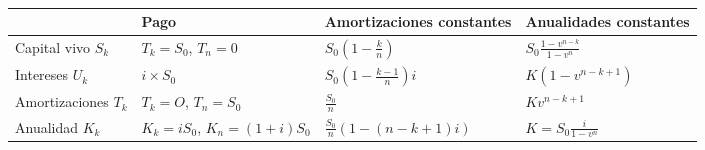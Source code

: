 \begin{f} 
\ \newline

	\footnotesize
\renewcommand{\arraystretch}{2}
\begin{tabular}{|m{10ex}|m{19ex}|m{19ex}|m{17ex}|}
\rowcolor{BleuProfondIRA!40}   	\hline &\textbf{Pago}			&   	\textbf{Amortizaciones constantes} &  		\textbf{Anualidades constantes} \\
	\hline Capital vivo \(S_k\) & \(T_k=S_0\), \(T_n=0\)& \(S_{0}\left(1-\frac{k}{n}\right)\) & \(S_{0} \frac{1-v^{n-k}}{1-v^{n}}\)\\
	\hline Intereses \(U_k\) 		& \(i\times S_0\) & \(S_{0}\left(1-\frac{k-1}{n}\right) i\) & \(K\left(1-v^{n-k+1}\right)\) \\
	\hline Amortiza\-ciones \(T_k\) &	\(T_k=O\), \(T_n=S_0\) & \(\frac{S_{0}}{n}\) & \(K v^{n-k+1}\) \\
	\hline Anualidad \(K_k\) & 	\(K_k=i S_0\), \(K_n=(1+i)S_0\) 	 & \(\frac{S_{0}}{n}(1-(n-k+1) i) \) & \(K=S_{0} \frac{i}{1-v^{n}} \) \\
	\hline
\end{tabular}

\end{f}

